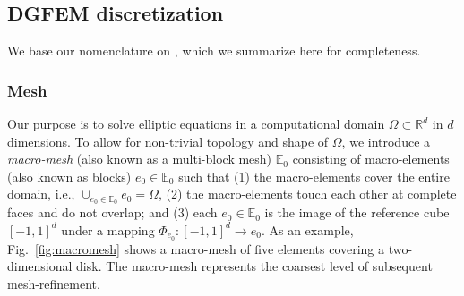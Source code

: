 \subsection{DGFEM discretization}
\label{sec:DGFEM}

We base our nomenclature on \cite{arnold.d;brezzi.f;cockburn.b;marini.l2002,sherwin20062d,di2011mathematical,fick2014interior,kozdon2018energy,kozdon2019robust}, which we summarize here for completeness.

\subsubsection{Mesh}
\label{sec:mesh}



Our purpose is to solve elliptic equations in a computational domain
$\Omega \subset \mathbb{R}^d$ in $d$ dimensions.  To allow for
non-trivial topology and shape of $\Omega$, we introduce a
\emph{macro-mesh} (also known as a multi-block mesh) $\mathbb{E}_0$ consisting of macro-elements (also known as blocks) $e_0 \in
\mathbb{E}_0$ such that (1) the macro-elements cover the entire
domain, i.e., $\cup_{e_0\in \mathbb{E}_0}e_0=\Omega$, (2) the
macro-elements touch each other at complete faces and do not overlap;
and (3) each $e_0 \in \mathbb{E}_0$ is the image of the reference cube
$[-1,1]^{d}$ under a mapping
  $\Phi_{e_0}:[-1,1]^d\rightarrow e_0$.  As an example,
Fig.~\ref{fig:macromesh} shows a macro-mesh of five elements covering a
two-dimensional disk.  The macro-mesh represents the coarsest level of
subsequent mesh-refinement.

